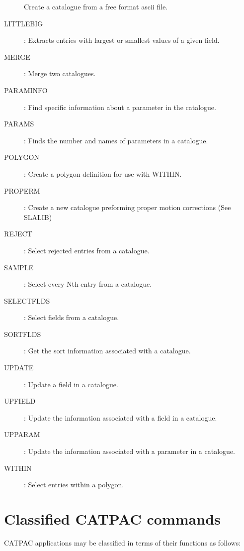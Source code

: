 \begin{description}
 Create a catalogue from a free format ascii file.
\item [LITTLEBIG]:
 Extracts entries with largest or smallest values of a given field.
\item [MERGE]:
 Merge two catalogues.
\item [PARAMINFO]:
 Find specific information about a parameter in the catalogue.
\item [PARAMS]:
 Finds the number and names of parameters in a catalogue.
\item [POLYGON]:
 Create a polygon definition for use with WITHIN.
\item [PROPERM]:
 Create a new catalogue preforming proper motion corrections (See SLALIB)
\item [REJECT]:
 Select rejected entries from a catalogue.
\item [SAMPLE]:
 Select every Nth entry from a catalogue.
\item [SELECTFLDS]:
 Select fields from a catalogue.
\item [SORTFLDS]:
 Get the sort information associated with a catalogue.
\item [UPDATE]:
 Update a field in a catalogue.
\item [UPFIELD]:
 Update the information associated with a field in a catalogue.
\item [UPPARAM]:
 Update the information associated with a parameter in a catalogue.
\item [WITHIN]:
 Select entries within a polygon.
\end{description}

\newpage
\section{Classified CATPAC commands}
\label{ap:classified}

{\small CATPAC} applications may be classified in terms of their
functions as follows:

